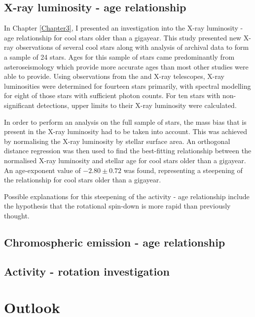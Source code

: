 \subsection{X-ray luminosity - age relationship}

In Chapter \ref{Chapter3}, I presented an investigation into the X-ray luminosity - age relationship for cool stars older than a gigayear. This study presented new X-ray observations of several cool stars along with analysis of archival data to form a sample of 24 stars. Ages for this sample of stars came predominantly from asteroseismology which provide more accurate ages than most other studies were able to provide. Using observations from the \Chandra and \XMM X-ray telescopes, X-ray luminosities were determined for fourteen stars primarily, with spectral modelling for eight of those stars with sufficient photon counts. For ten stars with non-significant detections, upper limits to their X-ray luminosity were calculated.

In order to perform an analysis on the full sample of stars, the mass bias that is present in the X-ray luminosity had to be taken into account. This was achieved by normalising the X-ray luminosity by stellar surface area. An orthogonal distance regression was then used to find the best-fitting relationship between the normalised X-ray luminosity and stellar age for cool stars older than a gigayear. An age-exponent value of $-2.80 \pm 0.72$ was found, representing a steepening of the relationship for cool stars older than a gigayear.

Possible explanations for this steepening of the activity - age relationship include the hypothesis that the rotational spin-down is more rapid than previously thought.

\subsection{Chromospheric emission - age relationship}

\subsection{Activity - rotation investigation}

\section{Outlook}



